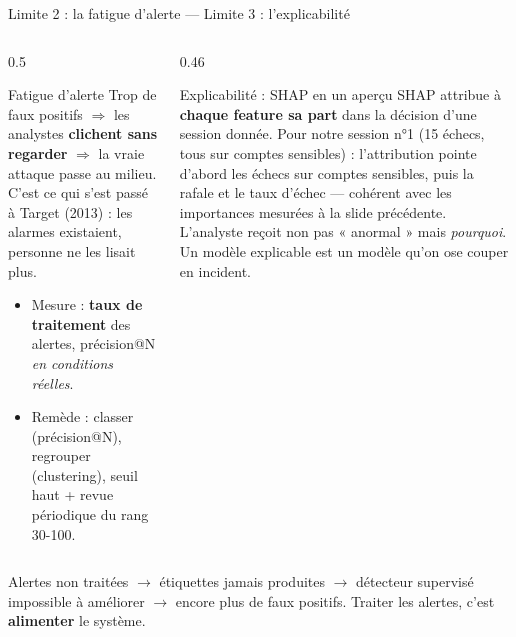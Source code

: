 \begin{frame}{Limite 2 : la fatigue d'alerte --- Limite 3 : l'explicabilité}
\begin{columns}[t]
\begin{column}{0.5\textwidth}
\begin{block}{Fatigue d'alerte}
Trop de faux positifs $\Rightarrow$ les analystes \textbf{clichent sans
regarder} $\Rightarrow$ la vraie attaque passe au milieu. C'est ce qui s'est
passé à Target (2013) : les alarmes existaient, personne ne les lisait plus.
\begin{itemize}
\item Mesure : \textbf{taux de traitement} des alertes, précision@N
\emph{en conditions réelles}.
\item Remède : classer (précision@N), regrouper (clustering), seuil haut +
revue périodique du rang 30-100.
\end{itemize}
\end{block}
\end{column}
\begin{column}{0.46\textwidth}
\begin{block}{Explicabilité : SHAP en un aperçu}
SHAP attribue à \textbf{chaque feature sa part} dans la décision d'une
session donnée. Pour notre session n°1 (15 échecs, tous sur comptes
sensibles) : l'attribution pointe d'abord les échecs sur comptes sensibles,
puis la rafale et le taux d'échec --- cohérent avec les importances
mesurées à la slide précédente.
L'analyste reçoit non pas « anormal » mais \emph{pourquoi}. Un modèle
explicable est un modèle qu'on ose couper en incident.
\end{block}
\end{column}
\end{columns}
\vspace{1mm}
\begin{wbox}
Alertes non traitées $\rightarrow$ étiquettes jamais produites $\rightarrow$
détecteur supervisé impossible à améliorer $\rightarrow$ encore plus de faux
positifs. Traiter les alertes, c'est \textbf{alimenter} le système.
\end{wbox}
\end{frame}

